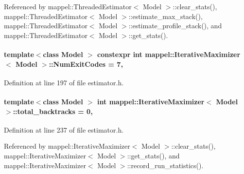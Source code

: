 Referenced by mappel\+::\+Threaded\+Estimator$<$ Model $>$\+::clear\+\_\+stats(), mappel\+::\+Threaded\+Estimator$<$ Model $>$\+::estimate\+\_\+max\+\_\+stack(), mappel\+::\+Threaded\+Estimator$<$ Model $>$\+::estimate\+\_\+profile\+\_\+stack(), and mappel\+::\+Threaded\+Estimator$<$ Model $>$\+::get\+\_\+stats().

\paragraph[{\texorpdfstring{Num\+Exit\+Codes}{NumExitCodes}}]{\setlength{\rightskip}{0pt plus 5cm}template$<$class Model $>$ constexpr int {\bf mappel\+::\+Iterative\+Maximizer}$<$ Model $>$\+::Num\+Exit\+Codes = 7\hspace{0.3cm}{\ttfamily [static]}, {\ttfamily [inherited]}}\hypertarget{classmappel_1_1IterativeMaximizer_a04888d87aa205d54e7cae5a97d1c1e75}{}\label{classmappel_1_1IterativeMaximizer_a04888d87aa205d54e7cae5a97d1c1e75}


Definition at line 197 of file estimator.\+h.

\paragraph[{\texorpdfstring{total\+\_\+backtracks}{total_backtracks}}]{\setlength{\rightskip}{0pt plus 5cm}template$<$class Model $>$ int {\bf mappel\+::\+Iterative\+Maximizer}$<$ Model $>$\+::total\+\_\+backtracks = 0\hspace{0.3cm}{\ttfamily [protected]}, {\ttfamily [inherited]}}\hypertarget{classmappel_1_1IterativeMaximizer_a752717a4e69ba7cd44a6167d0cbdb242}{}\label{classmappel_1_1IterativeMaximizer_a752717a4e69ba7cd44a6167d0cbdb242}


Definition at line 237 of file estimator.\+h.



Referenced by mappel\+::\+Iterative\+Maximizer$<$ Model $>$\+::clear\+\_\+stats(), mappel\+::\+Iterative\+Maximizer$<$ Model $>$\+::get\+\_\+stats(), and mappel\+::\+Iterative\+Maximizer$<$ Model $>$\+::record\+\_\+run\+\_\+statistics().


